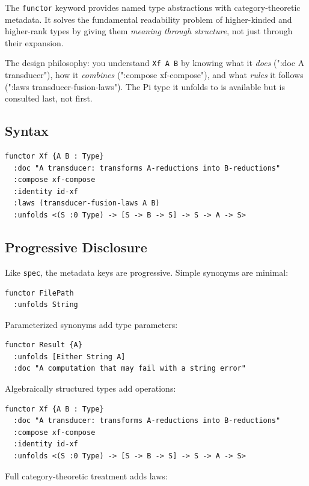 \documentclass[11pt]{article}
\begin{document}
The \texttt{functor} keyword provides named type abstractions with category-theoretic
metadata. It solves the fundamental readability problem of higher-kinded and
higher-rank types by giving them \emph{meaning through structure}, not just through
their expansion.

The design philosophy: you understand \texttt{Xf A B} by knowing what it \emph{does} (":doc
A transducer"), how it \emph{combines} (":compose xf-compose"), and what \emph{rules} it
follows (":laws transducer-fusion-laws"). The Pi type it unfolds to is available
but is consulted last, not first.
\subsection{Syntax}
\label{sec:org58e0864}

\begin{verbatim}
functor Xf {A B : Type}
  :doc "A transducer: transforms A-reductions into B-reductions"
  :compose xf-compose
  :identity id-xf
  :laws (transducer-fusion-laws A B)
  :unfolds <(S :0 Type) -> [S -> B -> S] -> S -> A -> S>
\end{verbatim}
\subsection{Progressive Disclosure}
\label{sec:org96ac7a6}

Like \texttt{spec}, the metadata keys are progressive. Simple synonyms are minimal:

\begin{verbatim}
functor FilePath
  :unfolds String
\end{verbatim}

Parameterized synonyms add type parameters:

\begin{verbatim}
functor Result {A}
  :unfolds [Either String A]
  :doc "A computation that may fail with a string error"
\end{verbatim}

Algebraically structured types add operations:

\begin{verbatim}
functor Xf {A B : Type}
  :doc "A transducer: transforms A-reductions into B-reductions"
  :compose xf-compose
  :identity id-xf
  :unfolds <(S :0 Type) -> [S -> B -> S] -> S -> A -> S>
\end{verbatim}

Full category-theoretic treatment adds laws:
\end{document}
